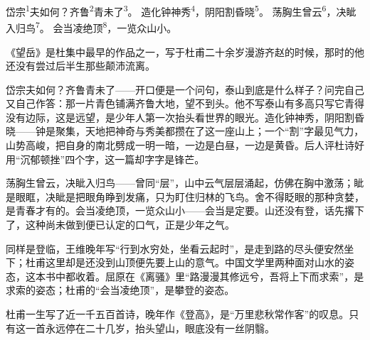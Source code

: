 
\begin{poem}
岱宗\textsuperscript{1}夫如何？齐鲁\textsuperscript{2}青未了\textsuperscript{3}。
造化钟神秀\textsuperscript{4}，阴阳割昏晓\textsuperscript{5}。
荡胸生曾云\textsuperscript{6}，决眦入归鸟\textsuperscript{7}。
会当凌绝顶\textsuperscript{8}，一览众山小。
\end{poem}

\begin{annotations}
\end{annotations}

\begin{appreciation}
《望岳》是杜集中最早的作品之一，写于杜甫二十余岁漫游齐赵的时候，那时的他还没有尝过后半生那些颠沛流离。

岱宗夫如何？齐鲁青未了——开口便是一个问句，泰山到底是什么样子？问完自己又自己作答：那一片青色铺满齐鲁大地，望不到头。他不写泰山有多高只写它青得没有边际，这是远望，是少年人第一次抬头看世界的眼光。造化钟神秀，阴阳割昏晓——钟是聚集，天地把神奇与秀美都攒在了这一座山上；一个“割”字最见气力，山势高峻，把自身的南北劈成一明一暗，一边是白昼，一边是黄昏。后人评杜诗好用“沉郁顿挫”四个字，这一篇却字字是锋芒。

荡胸生曾云，决眦入归鸟——曾同“层”，山中云气层层涌起，仿佛在胸中激荡；眦是眼眶，决眦是把眼角睁到发痛，只为盯住归林的飞鸟。舍不得眨眼的那种贪婪，是青春才有的。会当凌绝顶，一览众山小——会当是定要。山还没有登，话先撂下了，这种尚未做到便已认定的口气，正是少年之气。

同样是登临，王维晚年写“行到水穷处，坐看云起时”，是走到路的尽头便安然坐下；杜甫这里却是还没到山顶便先要上山的意气。中国文学里两种面对山水的姿态，这本书中都收着。屈原在《离骚》里“路漫漫其修远兮，吾将上下而求索”，是求索的姿态；杜甫的“会当凌绝顶”，是攀登的姿态。

杜甫一生写了近一千五百首诗，晚年作《登高》，是“万里悲秋常作客”的叹息。只有这一首永远停在二十几岁，抬头望山，眼底没有一丝阴翳。
\end{appreciation}
